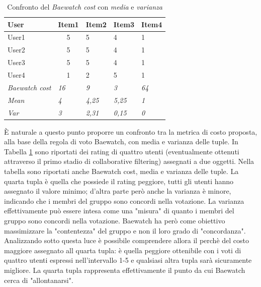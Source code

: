 \documentclass[letterpaper]{article}
\begin{document}
\begin{table}[]
\centering
\begin{tabular}{|l|l|l|l|l|}
\hline
\textbf{User}          & \textbf{Item1}         & \textbf{Item2} & \textbf{Item3} & \textbf{Item4} \\ \hline
User1                  & \multicolumn{1}{c|}{5} & 5              & 4              & 1              \\ \hline
User2                  & \multicolumn{1}{c|}{5} & 5              & 4              & 1              \\ \hline
User3                  & \multicolumn{1}{c|}{5} & 5              & 4              & 1              \\ \hline
User4                  & \multicolumn{1}{c|}{1} & 2              & 5              & 1              \\ \hline
\textit{Baewatch cost} & \textit{16}            & \textit{9}     & \textit{3}     & \textit{64}    \\ \hline
\textit{Mean}          & \textit{4}             & \textit{4,25}  & \textit{5,25}  & \textit{1}     \\ \hline
\textit{Var}           & \textit{3}             & \textit{2,31}  & \textit{0,15}  & \textit{0}     \\ \hline
\end{tabular}
\caption{Confronto del \textit{Baewatch cost} con \textit{media} e \textit{varianza}}
\label{table:4}
\end{table}

\`E naturale a questo punto proporre un confronto tra la metrica di costo proposta, alla base della regola di voto Baewatch, con media e varianza delle tuple. In Tabella \ref{table:4} sono riportati dei rating di quattro utenti (eventualmente ottenuti attraverso il primo stadio di collaborative filtering) assegnati a due oggetti. Nella tabella sono riportati anche Baewatch cost, media e varianza delle tuple. La quarta tupla è quella che possiede il rating peggiore, tutti gli utenti hanno assegnato il valore minimo; d'altra parte però anche la varianza è minore, indicando che i membri del gruppo sono concordi nella votazione. La varianza effettivamente può essere intesa come una "misura" di quanto i membri del gruppo sono concordi nella votazione. Baewatch ha però come obiettivo massimizzare la "contentezza" del gruppo e non il loro grado di "concordanza". Analizzando sotto questa luce è possibile comprendere allora il perchè del costo maggiore assegnato all quarta tupla: è quella peggiore ottenibile con i voti di quattro utenti espressi nell'intervallo 1-5 e qualsiasi altra tupla sarà sicuramente migliore. La quarta tupla rappresenta effettivamente il punto da cui Baewatch cerca di "allontanarsi".
\end{document}
